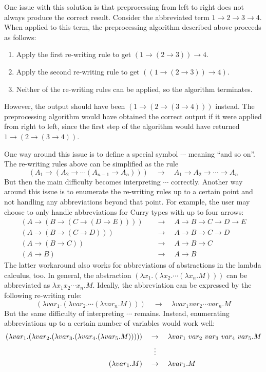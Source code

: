 One issue with this solution is that preprocessing from left to right does not always produce the correct result. Consider the abbreviated term $1 \to 2 \to 3 \to 4$. When applied to this term, the preprocessing algorithm described above proceeds as follows:
\begin{enumerate}
    \item Apply the first re-writing rule to get $(1 \to (2 \to 3)) \to 4$.
    \item Apply the second re-writing rule to get $((1 \to (2 \to 3)) \to 4)$.
    \item Neither of the re-writing rules can be applied, so the algorithm terminates.
\end{enumerate}
However, the output should have been $(1 \to (2 \to (3 \to 4)))$ instead. The preprocessing algorithm would have obtained the correct output if it were applied from right to left, since the first step of the algorithm would have returned $1 \to (2 \to (3 \to 4))$.

One way around this issue is to define a special symbol $\cdots$ meaning ``and so on''. The re-writing rules above can be simplified as the rule
\[
    (A_1 \to (A_2 \to \cdots (A_{n-1} \to A_n))) \quad \to \quad A_1 \to A_2 \to \cdots \to A_n
\]
But then the main difficulty becomes interpreting $\cdots$ correctly. Another way around this issue is to enumerate the re-writing rules up to a certain point and not handling any abbreviations beyond that point. For example, the user may choose to only handle abbreviations for Curry types with up to four arrows:
\begin{align*}
    (A \to (B \to (C \to (D \to E)))) \quad &\to \quad A \to B \to C \to D \to E \\
    (A \to (B \to (C \to D))) \quad &\to \quad A \to B \to C \to D \\
    (A \to (B \to C)) \quad &\to \quad A \to B \to C \\
    (A \to B) \quad &\to \quad A \to B
\end{align*}
The latter workaround also works for abbreviations of abstractions in the lambda calculus, too. In general, the abstraction $(\lambda x_1. (\lambda x_2. \cdots (\lambda x_n. M)))$ can be abbreviated as $\lambda x_1 x_2 \cdots x_n. M$. Ideally, the abbreviation can be expressed by the following re-writing rule:
\[
     (\lambda var_1. (\lambda var_2. \cdots (\lambda var_n. M))) \quad \to \quad \lambda var_1 var_2 \cdots var_n. M
\]
But the same difficulty of interpreting $\cdots$ remains. Instead, enumerating abbreviations up to a certain number of variables would work well:
\begin{align*}
    (\lambda var_1. (\lambda var_2. (\lambda var_3. (\lambda var_4. (\lambda var_5. M))))) \quad &\to \quad \lambda var_1\ var_2\ var_3\ var_4\ var_5. M \\
    &\vdotswithin{\to} \\
    (\lambda var_1. M) \quad &\to \quad \lambda var_1. M
\end{align*}

